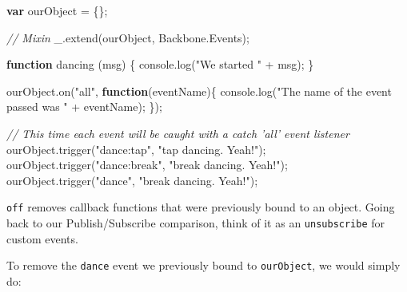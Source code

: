 \documentclass[9pt]{book}
\newenvironment{Shaded}{}{}
\newcommand{\KeywordTok}[1]{\textcolor[rgb]{0.00,0.44,0.13}{\textbf{{#1}}}}
\newcommand{\StringTok}[1]{\textcolor[rgb]{0.25,0.44,0.63}{{#1}}}
\newcommand{\CommentTok}[1]{\textcolor[rgb]{0.38,0.63,0.69}{\textit{{#1}}}}
\newcommand{\OtherTok}[1]{\textcolor[rgb]{0.00,0.44,0.13}{{#1}}}
\newcommand{\FunctionTok}[1]{\textcolor[rgb]{0.02,0.16,0.49}{{#1}}}
\newcommand{\NormalTok}[1]{{#1}}
\begin{document}
\begin{Shaded}
\begin{Highlighting}[]
\KeywordTok{var} \NormalTok{ourObject = \{\};}

\CommentTok{// Mixin}
\OtherTok{_}\NormalTok{.}\FunctionTok{extend}\NormalTok{(ourObject, }\OtherTok{Backbone}\NormalTok{.}\FunctionTok{Events}\NormalTok{);}

\KeywordTok{function} \FunctionTok{dancing} \NormalTok{(msg) \{ }\OtherTok{console}\NormalTok{.}\FunctionTok{log}\NormalTok{(}\StringTok{"We started "} \NormalTok{+ msg); \}}

\OtherTok{ourObject}\NormalTok{.}\FunctionTok{on}\NormalTok{(}\StringTok{"all"}\NormalTok{, }\KeywordTok{function}\NormalTok{(eventName)\{}
  \OtherTok{console}\NormalTok{.}\FunctionTok{log}\NormalTok{(}\StringTok{"The name of the event passed was "} \NormalTok{+ eventName);}
\NormalTok{\});}

\CommentTok{// This time each event will be caught with a catch 'all' event listener}
\OtherTok{ourObject}\NormalTok{.}\FunctionTok{trigger}\NormalTok{(}\StringTok{"dance:tap"}\NormalTok{, }\StringTok{"tap dancing. Yeah!"}\NormalTok{);}
\OtherTok{ourObject}\NormalTok{.}\FunctionTok{trigger}\NormalTok{(}\StringTok{"dance:break"}\NormalTok{, }\StringTok{"break dancing. Yeah!"}\NormalTok{);}
\OtherTok{ourObject}\NormalTok{.}\FunctionTok{trigger}\NormalTok{(}\StringTok{"dance"}\NormalTok{, }\StringTok{"break dancing. Yeah!"}\NormalTok{);}
\end{Highlighting}
\end{Shaded}

\texttt{off} removes callback functions that were previously bound to an
object. Going back to our Publish/Subscribe comparison, think of it as
an \texttt{unsubscribe} for custom events.

To remove the \texttt{dance} event we previously bound to
\texttt{ourObject}, we would simply do:
\end{document}
